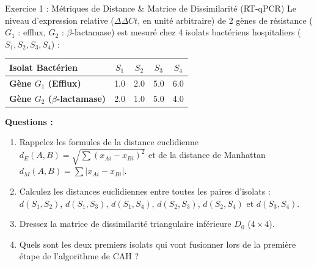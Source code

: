 \documentclass[11pt,a4paper]{article}
\begin{document}

\begin{exercicebox}{Exercice 1 : Métriques de Distance \& Matrice de Dissimilarité (RT-qPCR)}
Le niveau d'expression relative ($\Delta\Delta Ct$, en unité arbitraire) de 2 gènes de résistance ($G_1$ : efflux, $G_2$ : $\beta$-lactamase) est mesuré chez 4 isolats bactériens hospitaliers ($S_1, S_2, S_3, S_4$) :
\begin{center}
  \small
  \begin{tabular}{lcccc}
    \toprule
    \textbf{Isolat Bactérien} & $S_1$ & $S_2$ & $S_3$ & $S_4$ \\
    \midrule
    \textbf{Gène $G_1$ (Efflux)}          & 1.0 & 2.0 & 5.0 & 6.0 \\
    \textbf{Gène $G_2$ ($\beta$-lactamase)} & 2.0 & 1.0 & 5.0 & 4.0 \\
    \bottomrule
  \end{tabular}
\end{center}

\textbf{Questions :}
\begin{enumerate}[label=\textbf{\alph*.}]
  \item Rappelez les formules de la distance euclidienne $d_E(A, B) = \sqrt{\sum (x_{Ai} - x_{Bi})^2}$ et de la distance de Manhattan $d_M(A, B) = \sum |x_{Ai} - x_{Bi}|$.
  \item Calculez les distances euclidiennes entre toutes les paires d'isolats : $d(S_1, S_2)$, $d(S_1, S_3)$, $d(S_1, S_4)$, $d(S_2, S_3)$, $d(S_2, S_4)$ et $d(S_3, S_4)$.
  \item Dressez la matrice de dissimilarité triangulaire inférieure $D_0$ ($4 \times 4$).
  \item Quels sont les deux premiers isolats qui vont fusionner lors de la première étape de l'algorithme de CAH ?
\end{enumerate}
\end{exercicebox}
\end{document}
